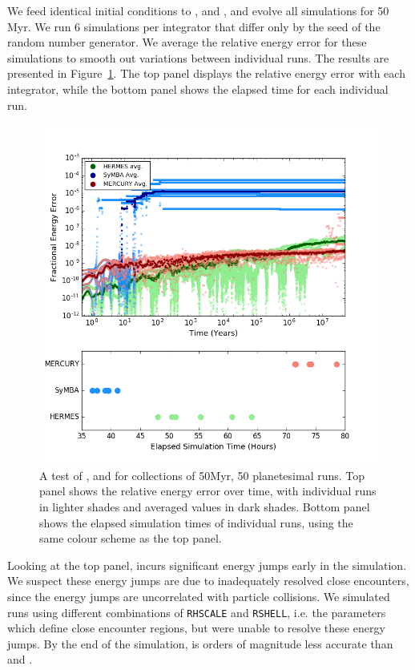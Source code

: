 We feed identical initial conditions to \symba, \mercury and \hermes, and evolve all simulations for 50 Myr. 
We run 6 simulations per integrator that differ only by the seed of the random number generator.
We average the relative energy error for these simulations to smooth out variations between individual runs.
The results are presented in Figure~\ref{fig:Np100test}.
The top panel displays the relative energy error with each integrator, while the bottom panel shows the elapsed time for each individual run.

\begin{figure}
\centerline{\includegraphics[scale=0.45]{chap4/images/energy_avg_FULL.png}}
\caption{A test of \hermes, \mercury and \symba for collections of 50Myr, 50 planetesimal runs. 
Top panel shows the relative energy error over time, with individual runs in lighter shades and averaged values in dark shades.
Bottom panel shows the elapsed simulation times of individual runs, using the same colour scheme as the top panel.
 }
\label{fig:Np100test}
\end{figure}

Looking at the top panel, \symba incurs significant energy jumps early in the simulation. 
We suspect these energy jumps are due to inadequately resolved close encounters, since the energy jumps are uncorrelated with particle collisions. 
We simulated runs using different combinations of {\sc \tt RHSCALE} and {\sc \tt RSHELL}, i.e. the parameters which define close encounter regions, but were unable to resolve these energy jumps. 
By the end of the simulation, \symba is orders of magnitude less accurate than \mercury and \hermes.

